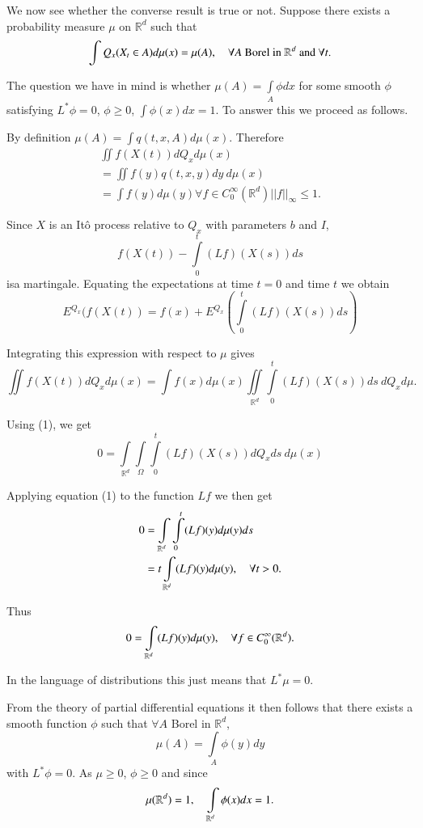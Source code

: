 We now see whether the converse result is true or not. Suppose there
exists a probability measure $\mu$ on $\mathbb{R}^{d}$ such that
$$
\int Q_{x}(X_{t}\in A)d\mu(x)=\mu(A),\quad \forall A\text{~ Borel in~ }
\mathbb{R}^{d}\text{~ and~ } \forall t.
$$

The question we have in mind is whether $\mu(A)=\int\limits_{A}\phi
dx$ for some smooth $\phi$ satisfying $L^{*}\phi=0$, $\phi\geq 0$,
$\int \phi(x)dx=1$. To answer this we proceed as follows.

By definition $\mu(A)=\int q(t,x,A)d\mu(x)$. Therefore
\begin{gather*}
\iint f(X(t))dQ_{x}d\mu(x)\\
=\iint f(y)q(t,x,y)dy\ d\mu(x)\\
=\int f(y)d\mu(y)\forall f\in
C^{\infty}_{0}(\mathbb{R}^{d})||f||_{\infty}\leq 1.\tag{1}
\end{gather*}

Since $X$ is an It\^o process relative to $Q_{x}$ with parameters $b$
and $I$,
$$
f(X(t))-\int\limits^{t}_{0}(Lf)(X(s))ds
$$
is\pageoriginale a martingale. Equating the expectations at time $t=0$
and time $t$ we obtain
$$
E^{Q_{x}}(f(X(t))=f(x)+E^{Q_{x}}\left(\int\limits^{t}_{0}(Lf)(X(s))ds\right)
$$

Integrating this expression with respect to $\mu$ gives
$$
\iint f(X(t))dQ_{x}d\mu(x)=\int
f(x)d\mu(x)\iint\limits_{\mathbb{R}^{d}}\int\limits^{t}_{0}(Lf)(X(s))ds\ dQ_{x}d\mu. 
$$

Using (1), we get
$$
0=\int\limits_{\mathbb{R}^{d}}\int\limits_{\Omega}\int\limits^{t}_{0}(Lf)(X(s))dQ_{x}ds\ d\mu(x)
$$

Applying equation (1) to the function $Lf$ we then get
\begin{align*}
0 &= \int\limits_{\mathbb{R}^{d}}\int\limits^{t}_{0}(Lf)(y)d\mu(y)ds\\
&= t \int\limits_{\mathbb{R}^{d}}(Lf)(y)d\mu(y),\quad \forall t>0.
\end{align*}

Thus
$$
0=\int\limits_{\mathbb{R}^{d}}(Lf)(y)d\mu(y),\quad \forall f\in
C^{\infty}_{0}(\mathbb{R}^{d}).
$$

In the language of distributions this just means that $L^{*}\mu=0$.

From the theory of partial differential equations it then follows that
there exists a smooth function $\phi$ such that $\forall A$ Borel in
$\mathbb{R}^{d}$,
$$
\mu(A)=\int\limits_{A}\phi(y)dy
$$
with $L^{*}\phi=0$. As $\mu\geq 0$, $\phi\geq 0$ and since
$$
\mu(\mathbb{R}^{d})=1,\quad \int\limits_{\mathbb{R}^{d}}\phi(x)dx=1.
$$\pageoriginale

